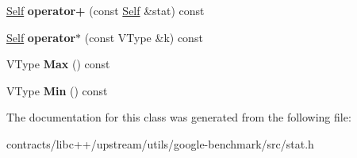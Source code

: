 \begin{DoxyCompactItemize}
\item 
\mbox{\label{classbenchmark_1_1_stat1_min_max_a61f4707c1947f20c9467c4b85b8d8c3f}} 
\mbox{\hyperlink{classbenchmark_1_1_stat1}{Self}} {\bfseries operator+} (const \mbox{\hyperlink{classbenchmark_1_1_stat1}{Self}} \&stat) const
\item 
\mbox{\label{classbenchmark_1_1_stat1_min_max_a74226ffa88ccc712d8b33a7c322b11ad}} 
\mbox{\hyperlink{classbenchmark_1_1_stat1}{Self}} {\bfseries operator$\ast$} (const V\+Type \&k) const
\item 
\mbox{\label{classbenchmark_1_1_stat1_min_max_abdf3c7b2362eeaa26932dab943bc6aed}} 
V\+Type {\bfseries Max} () const
\item 
\mbox{\label{classbenchmark_1_1_stat1_min_max_af54ba7c082e2f4c87b03c8caaf96219e}} 
V\+Type {\bfseries Min} () const
\end{DoxyCompactItemize}


The documentation for this class was generated from the following file\+:\begin{DoxyCompactItemize}
\item 
contracts/libc++/upstream/utils/google-\/benchmark/src/stat.\+h\end{DoxyCompactItemize}

